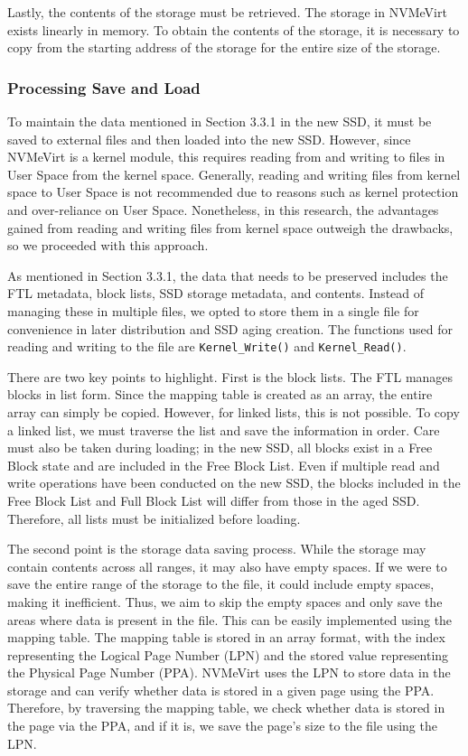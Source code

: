 Lastly, the contents of the storage must be retrieved.
The storage in NVMeVirt exists linearly in memory.
To obtain the contents of the storage, it is necessary to copy from the starting address of the storage for the entire size of the storage.


\subsubsection{Processing Save and Load}

To maintain the data mentioned in Section 3.3.1 in the new SSD, it must be saved to external files and then loaded into the new SSD.
However, since NVMeVirt is a kernel module, this requires reading from and writing to files in User Space from the kernel space.
Generally, reading and writing files from kernel space to User Space is not recommended due to reasons such as kernel protection and over-reliance on User Space.
Nonetheless, in this research, the advantages gained from reading and writing files from kernel space outweigh the drawbacks, so we proceeded with this approach.


As mentioned in Section 3.3.1, the data that needs to be preserved includes the FTL metadata, block lists, SSD storage metadata, and contents.
Instead of managing these in multiple files, we opted to store them in a single file for convenience in later distribution and SSD aging creation.
The functions used for reading and writing to the file are \texttt{Kernel\_Write()} and \texttt{Kernel\_Read()}.

There are two key points to highlight.
First is the block lists.
The FTL manages blocks in list form.
Since the mapping table is created as an array, the entire array can simply be copied.
However, for linked lists, this is not possible.
To copy a linked list, we must traverse the list and save the information in order.
Care must also be taken during loading; in the new SSD, all blocks exist in a Free Block state and are included in the Free Block List.
Even if multiple read and write operations have been conducted on the new SSD, the blocks included in the Free Block List and Full Block List will differ from those in the aged SSD.
Therefore, all lists must be initialized before loading.

The second point is the storage data saving process.
While the storage may contain contents across all ranges, it may also have empty spaces.
If we were to save the entire range of the storage to the file, it could include empty spaces, making it inefficient.
Thus, we aim to skip the empty spaces and only save the areas where data is present in the file.
This can be easily implemented using the mapping table.
The mapping table is stored in an array format, with the index representing the Logical Page Number (LPN) and the stored value representing the Physical Page Number (PPA).
NVMeVirt uses the LPN to store data in the storage and can verify whether data is stored in a given page using the PPA.
Therefore, by traversing the mapping table, we check whether data is stored in the page via the PPA, and if it is, we save the page's size to the file using the LPN.


